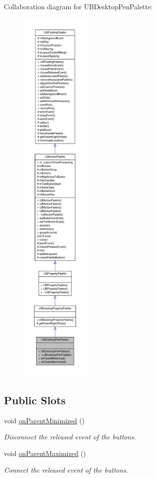 Collaboration diagram for U\-B\-Desktop\-Pen\-Palette\-:
\nopagebreak
\begin{figure}[H]
\begin{center}
\leavevmode
\includegraphics[height=550pt]{dc/dd5/class_u_b_desktop_pen_palette__coll__graph}
\end{center}
\end{figure}
\subsection*{Public Slots}
\begin{DoxyCompactItemize}
\item 
void \hyperlink{class_u_b_desktop_pen_palette_a1ebbe0f3a6b460be4cb4752b9d6ffe5e}{on\-Parent\-Minimized} ()
\begin{DoxyCompactList}\small\item\em Disconnect the released event of the buttons. \end{DoxyCompactList}\item 
void \hyperlink{class_u_b_desktop_pen_palette_ae40ce5ea3ce05079f6e93c4dad3fadb3}{on\-Parent\-Maximized} ()
\begin{DoxyCompactList}\small\item\em Connect the released event of the buttons. \end{DoxyCompactList}\end{DoxyCompactItemize}
